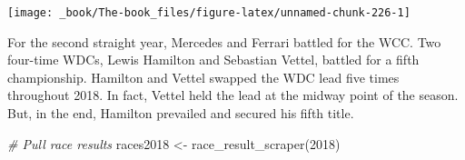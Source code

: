 \documentclass[
]{book}
\newenvironment{Shaded}{\begin{snugshade}}{\end{snugshade}}
\newcommand{\CommentTok}[1]{\textcolor[rgb]{0.56,0.35,0.01}{\textit{#1}}}
\newcommand{\DecValTok}[1]{\textcolor[rgb]{0.00,0.00,0.81}{#1}}
\newcommand{\FunctionTok}[1]{\textcolor[rgb]{0.00,0.00,0.00}{#1}}
\newcommand{\NormalTok}[1]{#1}
\newcommand{\OtherTok}[1]{\textcolor[rgb]{0.56,0.35,0.01}{#1}}
\begin{document}
\begin{center}\texttt{[image: \_book/The-book\_files/figure-latex/unnamed-chunk-226-1]} \end{center}

For the second straight year, Mercedes and Ferrari battled for the WCC. Two four-time WDCs, Lewis Hamilton and Sebastian Vettel, battled for a fifth championship. Hamilton and Vettel swapped the WDC lead five times throughout 2018. In fact, Vettel held the lead at the midway point of the season. But, in the end, Hamilton prevailed and secured his fifth title.

\begin{Shaded}
\begin{Highlighting}[]
\CommentTok{\# Pull race results}
\NormalTok{races2018 }\OtherTok{\textless{}{-}} \FunctionTok{race\_result\_scraper}\NormalTok{(}\DecValTok{2018}\NormalTok{)}


\end{Highlighting}
\end{Shaded}
\end{document}
